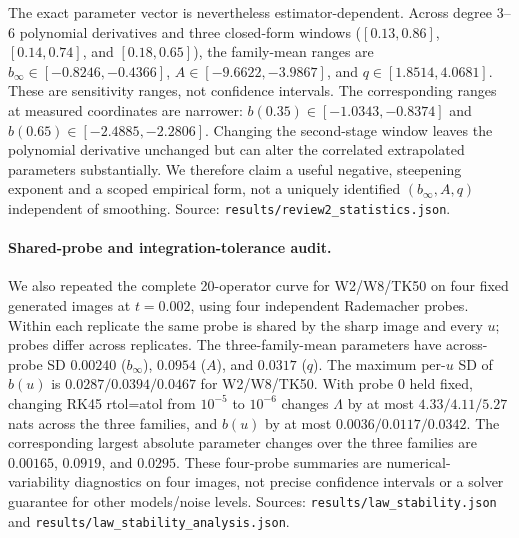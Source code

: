 \documentclass[10pt,journal]{IEEEtran}
\newcommand{\Lam}{\Lambda}
\begin{document}
The exact parameter vector is nevertheless estimator-dependent. Across degree 3--6 polynomial
derivatives and three closed-form windows ($[0.13,0.86]$, $[0.14,0.74]$, and $[0.18,0.65]$),
the family-mean ranges are $b_\infty\in[-0.8246,-0.4366]$, $A\in[-9.6622,-3.9867]$, and
$q\in[1.8514,4.0681]$. These are sensitivity ranges, not confidence intervals. The corresponding
ranges at measured coordinates are narrower: $b(0.35)\in[-1.0343,-0.8374]$ and
$b(0.65)\in[-2.4885,-2.2806]$. Changing the second-stage window leaves the polynomial derivative
unchanged but can alter the correlated extrapolated parameters substantially. We therefore claim
a useful negative, steepening exponent and a scoped empirical form, not a uniquely identified
$(b_\infty,A,q)$ independent of smoothing. Source: \texttt{results/review2\_statistics.json}.

\paragraph*{Shared-probe and integration-tolerance audit.}
We also repeated the complete 20-operator curve for W2/W8/TK50 on four fixed generated images
at $t=0.002$, using four independent Rademacher probes. Within each replicate the same probe is
shared by the sharp image and every $u$; probes differ across replicates. The three-family-mean
parameters have across-probe SD $0.00240$ ($b_\infty$), $0.0954$ ($A$), and $0.0317$ ($q$).
The maximum per-$u$ SD of $b(u)$ is $0.0287/0.0394/0.0467$ for W2/W8/TK50. With probe 0 held
fixed, changing RK45 rtol=atol from $10^{-5}$ to $10^{-6}$ changes $\Lam$ by at most
$4.33/4.11/5.27$ nats across the three families, and $b(u)$ by at most $0.0036/0.0117/0.0342$.
The corresponding largest absolute parameter changes over the three families are $0.00165$,
$0.0919$, and $0.0295$. These four-probe summaries are numerical-variability diagnostics on four
images, not precise confidence intervals or a solver guarantee for other models/noise levels.
Sources: \texttt{results/law\_stability.json} and
\texttt{results/law\_stability\_analysis.json}.
\end{document}
